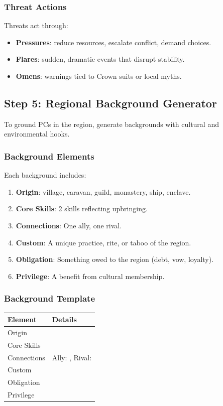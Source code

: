 \documentclass[11pt]{article}
\begin{document}
\subsubsection{Threat Actions}
Threats act through:
\begin{itemize}
    \item \textbf{Pressures}: reduce resources, escalate conflict, demand choices.
    \item \textbf{Flares}: sudden, dramatic events that disrupt stability.
    \item \textbf{Omens}: warnings tied to Crown suits or local myths.
\end{itemize}

\subsection{Step 5: Regional Background Generator}

To ground PCs in the region, generate backgrounds with cultural and environmental hooks.

\subsubsection{Background Elements}
Each background includes:
\begin{enumerate}
    \item \textbf{Origin}: village, caravan, guild, monastery, ship, enclave.
    \item \textbf{Core Skills}: 2 skills reflecting upbringing.
    \item \textbf{Connections}: One ally, one rival.
    \item \textbf{Custom}: A unique practice, rite, or taboo of the region.
    \item \textbf{Obligation}: Something owed to the region (debt, vow, loyalty).
    \item \textbf{Privilege}: A benefit from cultural membership.
\end{enumerate}

\subsubsection{Background Template}
\begin{center}
\begin{longtable}{|p{4cm}|p{7cm}|}
\hline
\textbf{Element} & \textbf{Details} \\
\hline
Origin & \underline{\phantom{XXXXXXXXXXXXXXXX}} \\
Core Skills & \underline{\phantom{XXXXXXXXXXXX}} \\
Connections & Ally: \underline{\phantom{XXXXX}}, Rival: \underline{\phantom{XXXXX}} \\
Custom & \underline{\phantom{XXXXXXXXXXXXXX}} \\
Obligation & \underline{\phantom{XXXXXXXX}} \\
Privilege & \underline{\phantom{XXXXXXXX}} \\
\hline
\end{longtable}
\end{center}
\end{document}
